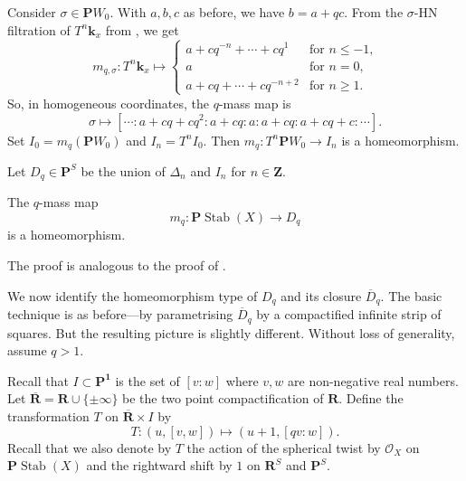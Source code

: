 \documentclass{amsart}
\begin{document}
Consider \(\sigma \in \mathbf{P}W_0\).
With \(a,b,c\) as before, we have \(b = a + qc\).
From the \(\sigma\)-HN filtration of \(T^n\mathbf{k}_x\) from , we get
\[ m_{q, \sigma} \colon T^n \mathbf{k}_x \mapsto
  \begin{cases}
    a + cq^{-n}+ \cdots + c q^{1} &\text{for \(n \leq -1\),}\\
    a &\text{for \(n = 0\),}\\
    a + cq + \cdots + c q^{-n+2} & \text{for \(n \geq 1\)}.
  \end{cases}
\]
So, in homogeneous coordinates, the \(q\)-mass map is
\[ \sigma \mapsto [ \cdots :a + cq+cq^2 : a + cq :a: a+cq: a + cq + c: \cdots ].\]
Set \(I_{0} = m_q(\mathbf{P}W_0)\) and \(I_n = T^nI_0\).
Then \(m_q \colon T^n \mathbf{P}W_0 \to I_n\) is a homeomorphism.

Let \(D_q \in \mathbf{P}^S\) be the union of \(\Delta_n\) and \(I_n\) for \(n \in \mathbf{Z}\).
\begin{theorem}\label{thm:q-homeo}
  The \(q\)-mass map
  \[ m_q \colon \mathbf{P} \operatorname{Stab}(X) \to D_q\]
  is a homeomorphism.
\end{theorem}
The proof is analogous to the proof of .

We now identify the homeomorphism type of \(D_q\) and its closure \(\overline D_q\).
The basic technique is as before---by parametrising \(\overline D_q\) by a compactified infinite strip of squares.
But the resulting picture is slightly different.
Without loss of generality, assume \(q > 1\).

Recall that \(I  \subset \mathbf{P^1}\) is the set of \([v:w]\) where \(v, w\) are non-negative real numbers.
Let \(\overline {\mathbf{R}} = \mathbf{R} \cup \{\pm \infty\}\) be the two point compactification of \(\mathbf{R}\).
Define the transformation \(T\) on \(\overline{\mathbf{R}} \times I\) by
\[ T \colon (u,[v,w]) \mapsto (u+1,[qv:w]).\]
Recall that we also denote by \(T\) the action of the spherical twist by \(\mathcal{O}_X\) on \(\mathbf{P} \operatorname{Stab}(X)\) and the rightward shift by \(1\) on \(\mathbf{R}^S\) and \(\mathbf{P}^S\).
\end{document}
